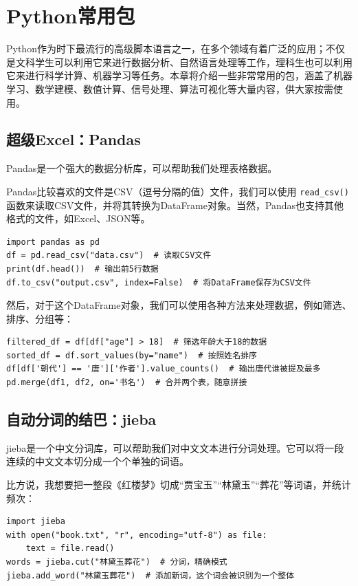 \chapter{Python常用包}\label{chap:python-advanced}

Python作为时下最流行的高级脚本语言之一，在多个领域有着广泛的应用；不仅是文科学生可以利用它来进行数据分析、自然语言处理等工作，理科生也可以利用它来进行科学计算、机器学习等任务。本章将介绍一些非常常用的包，涵盖了机器学习、数学建模、数值计算、信号处理、算法可视化等大量内容，供大家按需使用。

\section{超级Excel：Pandas}\label{sec:pandas}

Pandas是一个强大的数据分析库，可以帮助我们处理表格数据。

Pandas比较喜欢的文件是CSV（逗号分隔的值）文件，我们可以使用 \texttt{read\_csv()} 函数来读取CSV文件，并将其转换为DataFrame对象。当然，Pandas也支持其他格式的文件，如Excel、JSON等。

\begin{verbatim}
import pandas as pd
df = pd.read_csv("data.csv")  # 读取CSV文件
print(df.head())  # 输出前5行数据
df.to_csv("output.csv", index=False)  # 将DataFrame保存为CSV文件
\end{verbatim}

然后，对于这个DataFrame对象，我们可以使用各种方法来处理数据，例如筛选、排序、分组等：
\begin{verbatim}
filtered_df = df[df["age"] > 18]  # 筛选年龄大于18的数据
sorted_df = df.sort_values(by="name")  # 按照姓名排序
df[df['朝代'] == '唐']['作者'].value_counts()  # 输出唐代谁被提及最多
pd.merge(df1, df2, on='书名')  # 合并两个表，随意拼接
\end{verbatim}

\section{自动分词的结巴：jieba}
jieba是一个中文分词库，可以帮助我们对中文文本进行分词处理。它可以将一段连续的中文文本切分成一个个单独的词语。

比方说，我想要把一整段《红楼梦》切成“贾宝玉”“林黛玉”“葬花”等词语，并统计频次：
\begin{verbatim}
import jieba
with open("book.txt", "r", encoding="utf-8") as file:
    text = file.read()
words = jieba.cut("林黛玉葬花")  # 分词，精确模式
jieba.add_word("林黛玉葬花")  # 添加新词，这个词会被识别为一个整体
\end{verbatim}

